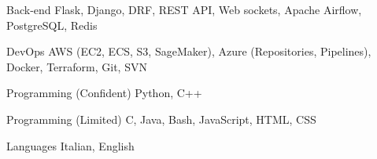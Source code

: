 

\begin{cvskills}

  \cvskill
    {Back-end} %
    {Flask, Django, DRF, REST API, Web sockets, Apache Airflow, PostgreSQL, Redis} %

  \cvskill
    {DevOps} %
    {AWS (EC2, ECS, S3, SageMaker), Azure (Repositories, Pipelines), Docker, Terraform, Git, SVN} %


  \cvskill
    {Programming (Confident)} %
    {Python, C++} %
  
  \cvskill
    {Programming (Limited)} %
    {C, Java, Bash, JavaScript, HTML, CSS} %

  \cvskill
    {Languages} %
    {Italian, English} %

\end{cvskills}
